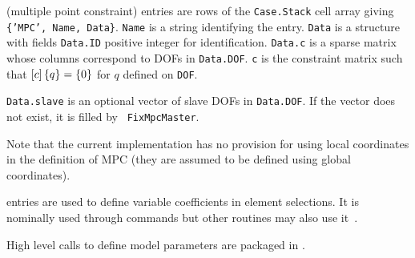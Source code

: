 
 (multiple point constraint) entries are rows of the {\tt Case.Stack} cell array giving {\tt \{'MPC', Name, Data\}}. {\tt Name} is a string identifying the entry. {\tt Data} is a structure with fields {\tt Data.ID} positive integer for identification. {\tt Data.c} is a sparse matrix whose columns correspond to DOFs in {\tt Data.DOF}. {\tt c} is the constraint matrix such that $\left[c\right] \left\{q\right\} = \left\{0\right\}$ for $q$ defined on {\tt DOF}.

{\tt Data.slave} is an optional vector of slave DOFs in {\tt Data.DOF}. If the vector does not exist, it is filled by \feutil\ {\tt FixMpcMaster}.

Note that the current implementation has no provision for using local coordinates in the definition of MPC (they are assumed to be defined using global coordinates).


 entries are used to define variable coefficients in element selections. It is nominally used through  commands but other routines may also use it~\cite{bal43}.

High level calls to define model parameters are packaged in .

